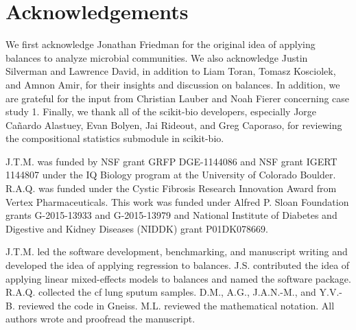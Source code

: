 \section{Acknowledgements}
We first acknowledge Jonathan Friedman for the original idea of applying balances to analyze microbial communities. We also acknowledge Justin Silverman and Lawrence David, in addition to Liam Toran, Tomasz Kosciolek, and Amnon Amir, for their insights and discussion on balances. In addition, we are grateful for the input from Christian Lauber and Noah Fierer concerning case study 1. Finally, we thank all of the scikit-bio developers, especially Jorge Cañardo Alastuey, Evan Bolyen, Jai Rideout, and Greg Caporaso, for reviewing the compositional statistics submodule in scikit-bio.

J.T.M. was funded by NSF grant GRFP DGE-1144086 and NSF grant IGERT 1144807 under the IQ Biology program at the University of Colorado Boulder. R.A.Q. was funded under the Cystic Fibrosis Research Innovation Award from Vertex Pharmaceuticals. This work was funded under Alfred P. Sloan Foundation grants G-2015-13933 and G-2015-13979 and National Institute of Diabetes and Digestive and Kidney Diseases (NIDDK) grant P01DK078669.

J.T.M. led the software development, benchmarking, and manuscript writing and developed the idea of applying regression to balances. J.S. contributed the idea of applying linear mixed-effects models to balances and named the software package. R.A.Q. collected the \gls{cf} lung sputum samples. D.M., A.G., J.A.N.-M., and Y.V.-B. reviewed the code in Gneiss. M.L. reviewed the mathematical notation. All authors wrote and proofread the manuscript.
